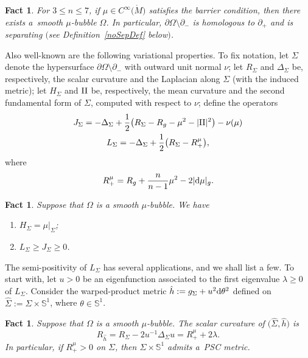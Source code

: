 \documentclass[10pt,a4paper]{amsart}
\numberwithin{equation}{section}
\newtheorem{Fact}[Theorem]{Fact}
\def\II{{\rm II}}
\def\S{\mathbb{S}}
\def\ed{{\rm d}}
\begin{document}
\begin{Fact}\label{mubbExist}
	For $3\le n\le 7$, if $\mu\in C^\infty\big(\mathring{M}\big)$ satisfies the barrier condition, then
	there exists a~smooth $\mu$-bubble $\Omega$.
	In particular, $\partial\Omega \setminus \partial_-$ is homologous to
	$\partial_+$ and is separating $($see Definition~{\rm \ref{noSepDef}} below$)$.
\end{Fact}

Also well-known are the following variational properties. To fix notation,
let $\Sigma$ denote the hypersurface $\partial\Omega\setminus \partial_-$
with outward unit normal $\nu$; let $R_\Sigma$ and $\Delta_\Sigma$ be, respectively, the scalar
curvature and the Laplacian along $\Sigma$ (with the induced metric);
 let $H_\Sigma$ and $\II$ be, respectively, the mean curvature and
the second fundamental form of $\Sigma$, computed with respect to $\nu$;
define the operators
\begin{gather*}%
	J_\Sigma = -\Delta_\Sigma + \frac{1}{2}\bigl(R_\Sigma - R_g - \mu^2 - |\II|^2\bigr) - \nu(\mu)
\\ %
	L_\Sigma =  - \Delta_\Sigma + \frac{1}{2}\bigl(R_\Sigma - R^\mu_+\bigr),
\end{gather*}
where
\begin{equation}\label{RplusDef}
	R^\mu_+ = R_g + \frac{n}{n-1}\mu^2 - 2|\ed\mu|_g.
\end{equation}
\begin{Fact}\label{mubbVarProp}
	Suppose that $\Omega$ is a smooth $\mu$-bubble.
	We have
	\begin{enumerate}\itemsep=0pt
		\item[$(a)$] $H_\Sigma = \mu|_\Sigma$;
		\item[$(b)$] $L_\Sigma \ge J_\Sigma\ge 0$.
	\end{enumerate}
\end{Fact}

The semi-positivity of $L_\Sigma$ has several applications, and we shall list a few.
To start with, let $u > 0$ be an eigenfunction associated to the first eigenvalue
$\lambda\ge 0$ of $L_\Sigma$. Consider the warped-product metric
$\hat h :=g_\Sigma + u^2\ed \theta^2$ defined on $\hat \Sigma := \Sigma\times \S^1$,
where $\theta\in \S^1$.
\begin{Fact}\label{warpPSC}
	Suppose that $\Omega$ is a smooth $\mu$-bubble.
	The scalar curvature of $\big(\hat\Sigma,\hat h\big)$
	is
	\begin{equation*}
		R_{\hat h} = R_\Sigma - 2u^{-1}\Delta_\Sigma u = R^\mu_+ +  2\lambda.
	\end{equation*}
	In particular, if $R^\mu_+ >0$ on $\Sigma$, then $\Sigma\times \S^1$
	admits a~PSC metric.
\end{Fact}
\end{document}

